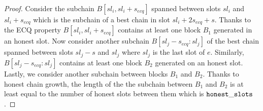 \begin{proof}
	Consider the subchain $ B[sl_i,sl_i+s_{ecq}] $ spanned between slots $ sl_i $ and $ sl_i + s_{ecq} $  which is the subchain of a best chain in slot $ sl_i +  2s_{ecq} + s  $. Thanks to the ECQ property $ B[sl_i,sl_i+s_{ecq}] $ contains at least one block $ B_1 $ generated in an honest slot.   Now consider another subchain $ B[sl_j -s_{ecq} :sl_j] $ of the best chain spanned between slots $ sl_j - s $ and $ sl_j $ where $ sl_j $  is the last slot of $ e $. Similarly, $ B[sl_j -s_{ecq} :sl_j] $ contains at least one block $ B_2 $ generated on an honest slot. Lastly, we consider another subchain between blocks $ B_1 $ and $ B_2 $.  Thanks to honest chain growth, the length of the the subchain between $ B_1 $ and $ B_2 $ is at least equal to the number of honest slots between them which is $ \mathtt{honest\_slots} $. 
\end{proof}

%
%
%
%
%
%
%
%








